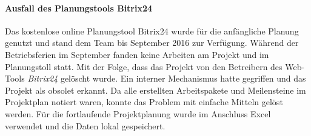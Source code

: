 \paragraph{Ausfall des Planungstools Bitrix24} Das kostenlose online Planungstool Bitrix24 wurde für die anfängliche Planung genutzt und stand dem Team bis September 2016 zur Verfügung. Während der Betriebsferien im September fanden keine Arbeiten am Projekt und im Planungstoll statt. Mit der Folge, dass das Projekt von den Betreibern des Web-Tools \textit{Bitrix24} gelöscht wurde. Ein interner Mechanismus hatte gegriffen und das Projekt als obsolet erkannt. Da alle erstellten Arbeitspakete und Meilensteine im Projektplan notiert waren, konnte das Problem mit einfache Mitteln gelöst werden. Für die fortlaufende Projektplanung wurde im Anschluss Excel verwendet und die Daten lokal gespeichert.


